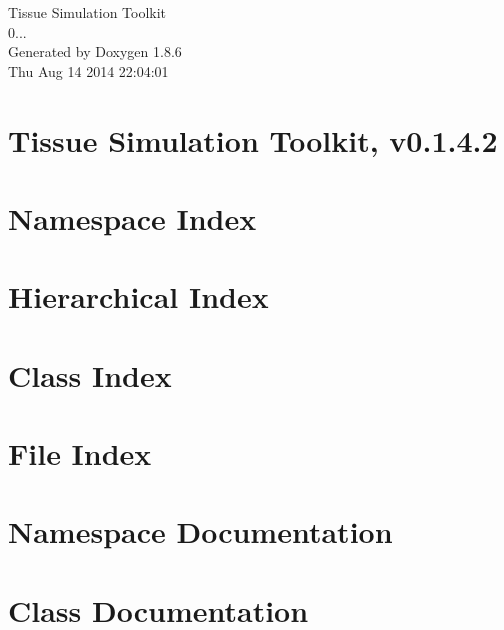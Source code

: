 \documentclass[twoside]{book}
\newcommand{\clearemptydoublepage}{%
  \newpage{\pagestyle{empty}\cleardoublepage}%
}
\begin{document}
\begin{titlepage}
\vspace*{7cm}
\begin{center}%
{\Large Tissue Simulation Toolkit \\[1ex]\large 0... }\\
\vspace*{1cm}
{\large Generated by Doxygen 1.8.6}\\
\vspace*{0.5cm}
{\small Thu Aug 14 2014 22:04:01}\\
\end{center}
\end{titlepage}
\clearemptydoublepage
\tableofcontents
\clearemptydoublepage
{}

\chapter{Tissue Simulation Toolkit, v0.1.4.2}
\label{index}
\chapter{Namespace Index}

\chapter{Hierarchical Index}

\chapter{Class Index}

\chapter{File Index}

\chapter{Namespace Documentation}

\chapter{Class Documentation}













\end{document}
